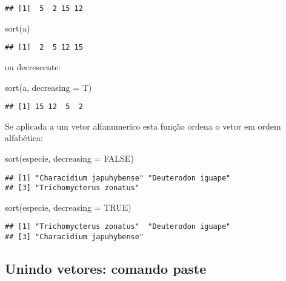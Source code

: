 \documentclass[
]{book}
\newenvironment{Shaded}{\begin{snugshade}}{\end{snugshade}}
\newcommand{\AttributeTok}[1]{\textcolor[rgb]{0.77,0.63,0.00}{#1}}
\newcommand{\ConstantTok}[1]{\textcolor[rgb]{0.00,0.00,0.00}{#1}}
\newcommand{\FunctionTok}[1]{\textcolor[rgb]{0.00,0.00,0.00}{#1}}
\newcommand{\NormalTok}[1]{#1}
\begin{document}
\begin{verbatim}
## [1]  5  2 15 12
\end{verbatim}

\begin{Shaded}
\begin{Highlighting}[]
\FunctionTok{sort}\NormalTok{(a)}
\end{Highlighting}
\end{Shaded}

\begin{verbatim}
## [1]  2  5 12 15
\end{verbatim}

ou decrescente:

\begin{Shaded}
\begin{Highlighting}[]
\FunctionTok{sort}\NormalTok{(a, }\AttributeTok{decreasing =}\NormalTok{ T)}
\end{Highlighting}
\end{Shaded}

\begin{verbatim}
## [1] 15 12  5  2
\end{verbatim}

Se aplicada a um vetor alfanumerico esta função ordena o vetor em ordem alfabética:

\begin{Shaded}
\begin{Highlighting}[]
\FunctionTok{sort}\NormalTok{(especie, }\AttributeTok{decreasing =} \ConstantTok{FALSE}\NormalTok{)}
\end{Highlighting}
\end{Shaded}

\begin{verbatim}
## [1] "Characidium japuhybense" "Deuterodon iguape"      
## [3] "Trichomycterus zonatus"
\end{verbatim}

\begin{Shaded}
\begin{Highlighting}[]
\FunctionTok{sort}\NormalTok{(especie, }\AttributeTok{decreasing =} \ConstantTok{TRUE}\NormalTok{)}
\end{Highlighting}
\end{Shaded}

\begin{verbatim}
## [1] "Trichomycterus zonatus"  "Deuterodon iguape"      
## [3] "Characidium japuhybense"
\end{verbatim}

\hypertarget{unindo-vetores-comando-paste}{%
\subsection{Unindo vetores: comando paste}\label{unindo-vetores-comando-paste}}
\end{document}
